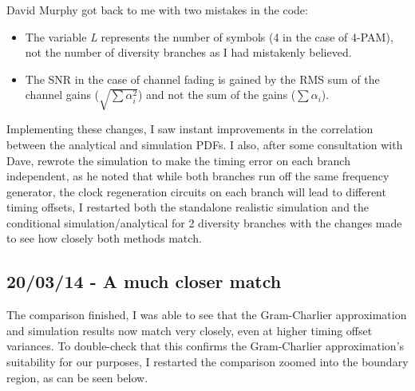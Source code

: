 David Murphy got back to me with two mistakes in the code:

\begin{itemize}
\itemsep1pt\parskip0pt
\item
  The variable \emph{L} represents the number of symbols (4 in the case
  of 4-PAM), not the number of diversity branches as I had mistakenly
  believed.
\item
  The SNR in the case of channel fading is gained by the RMS sum of the
  channel gains ($\sqrt{\sum \alpha_i^2}$) and not the sum of the gains
  ($\sum \alpha_i$).
\end{itemize}

Implementing these changes, I saw instant improvements in the
correlation between the analytical and simulation PDFs. I also, after
some consultation with Dave, rewrote the simulation to make the timing
error on each branch independent, as he noted that while both branches
run off the same frequency generator, the clock regeneration circuits on
each branch will lead to different timing offsets, I restarted both the
standalone realistic simulation and the conditional
simulation/analytical for 2 diversity branches with the changes made to
see how closely both methods match.

\subsection{20/03/14 - A much closer match}

The comparison finished, I was able to see that the Gram-Charlier
approximation and simulation results now match very closely, even at
higher timing offset variances. To double-check that this confirms the
Gram-Charlier approximation's suitability for our purposes, I restarted
the comparison zoomed into the boundary region, as can be seen below.

